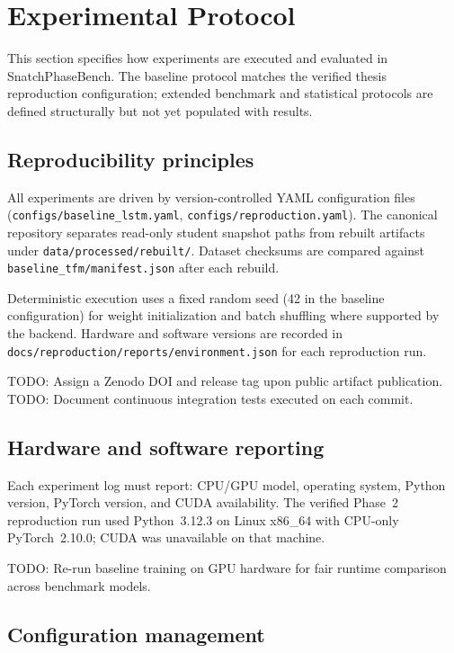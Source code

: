 \section{Experimental Protocol}
\label{sec:protocol}

This section specifies how experiments are executed and evaluated in SnatchPhaseBench.
The baseline protocol matches the verified thesis reproduction configuration; extended benchmark and statistical protocols are defined structurally but not yet populated with results.

\subsection{Reproducibility principles}
\label{sec:protocol:repro}

All experiments are driven by version-controlled YAML configuration files (\texttt{configs/baseline\_lstm.yaml}, \texttt{configs/reproduction.yaml}).
The canonical repository separates read-only student snapshot paths from rebuilt artifacts under \texttt{data/processed/rebuilt/}.
Dataset checksums are compared against \texttt{baseline\_tfm/manifest.json} after each rebuild.

Deterministic execution uses a fixed random seed (42 in the baseline configuration) for weight initialization and batch shuffling where supported by the backend.
Hardware and software versions are recorded in \texttt{docs/reproduction/reports/environment.json} for each reproduction run.

\textsc{TODO:} Assign a Zenodo DOI and release tag upon public artifact publication.
\textsc{TODO:} Document continuous integration tests executed on each commit.

\subsection{Hardware and software reporting}
\label{sec:protocol:hardware}

Each experiment log must report:
CPU/GPU model, operating system, Python version, PyTorch version, and CUDA availability.
The verified Phase~2 reproduction run used Python~3.12.3 on Linux x86\_64 with CPU-only PyTorch~2.10.0; CUDA was unavailable on that machine.

\textsc{TODO:} Re-run baseline training on GPU hardware for fair runtime comparison across benchmark models.

\subsection{Configuration management}
\label{sec:protocol:config}

